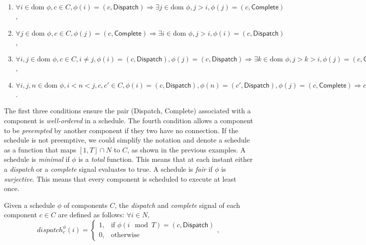 \begin{enumerate}
	\item $ \forall i\in \text{dom }\phi, c\in C, \phi(i) = (c, \textsf{Dispatch}) \Rightarrow \exists j\in \text{dom }\phi, j > i, \phi(j) =  (c, \textsf{Complete}) $,
	\item $ \forall j\in \text{dom }\phi, c\in C, \phi(j) = (c, \textsf{Complete}) \Rightarrow \exists i\in \text{dom }\phi, j > i, \phi(i) =  (c, \textsf{Dispatch}) $,
	\item $ \forall i, j\in \text{dom }\phi, c\in C, i \neq j, \phi(i) = (c, \textsf{Dispatch}), \phi(j) = (c, \textsf{Dispatch}) \Rightarrow \exists k\in \text{dom }\phi, j >k> i, \phi(j) =  (c, \textsf{Complete}) $,
	\item $ \forall i, j, n\in \text{dom }\phi, i < n < j, c, c'\in C, \phi(i) = (c, \textsf{Dispatch}), \phi(n) = (c', \textsf{Dispatch}), \phi(j) = (c, \textsf{Complete}) \Rightarrow c, c' \text{ are not connected, and }\exists m\in \text{dom }\phi, n < m < j, \phi(m) =  (c', \textsf{Complete}) $.
\end{enumerate}

The first three conditions ensure the pair (\textsf{Dispatch}, \textsf{Complete}) associated with a component is \emph{well-ordered} in a schedule. 
The fourth condition allows a component to be \emph{preempted} by another component if they two have no connection.
If the schedule is not preemptive, we could simplify the notation and denote a schedule as a function that maps $[1, T] \cap N$ to $C$, as shown in the previous examples.
A schedule is \emph{minimal} if $\phi$ is a \emph{total} function. This means that at each instant either a \emph{dispatch} or a \emph{complete} signal evaluates to true. 
A schedule is \emph{fair} if $\phi$ is \emph{surjective}. This means that every component is scheduled to execute at least once.

Given a schedule $\phi$ of components $C$, the \emph{dispatch} and \emph{complete} signal of each component $c \in C$ are defined as follows: $\forall i \in N$,
\begin{equation*}
\label{eqn:dispatch}
    dispatch_c^\phi(i) =
    \begin{cases}
      1, & \text{if } \phi(i \mod T) = (c, \textsf{Dispatch}) \\
      0, & \text{otherwise}
    \end{cases},
\end{equation*}

